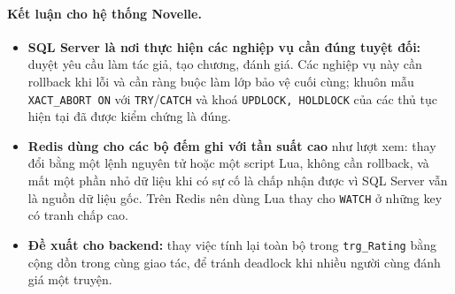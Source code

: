 \paragraph{Kết luận cho hệ thống Novelle.}
\begin{itemize}
    \item \textbf{SQL Server là nơi thực hiện các nghiệp vụ cần đúng tuyệt đối:} duyệt yêu cầu làm tác giả, tạo chương, đánh giá. Các nghiệp vụ này cần rollback khi lỗi và cần ràng buộc làm lớp bảo vệ cuối cùng; khuôn mẫu \texttt{XACT\_ABORT ON} với \texttt{TRY}/\texttt{CATCH} và khoá \texttt{UPDLOCK, HOLDLOCK} của các thủ tục hiện tại đã được kiểm chứng là đúng.
    \item \textbf{Redis dùng cho các bộ đếm ghi với tần suất cao} như lượt xem: thay đổi bằng một lệnh nguyên tử hoặc một script Lua, không cần rollback, và mất một phần nhỏ dữ liệu khi có sự cố là chấp nhận được vì SQL Server vẫn là nguồn dữ liệu gốc. Trên Redis nên dùng Lua thay cho \texttt{WATCH} ở những key có tranh chấp cao.
    \item \textbf{Đề xuất cho backend:} thay việc tính lại toàn bộ trong \texttt{trg\_Rating} bằng cộng dồn trong cùng giao tác, để tránh deadlock khi nhiều người cùng đánh giá một truyện.
\end{itemize}
